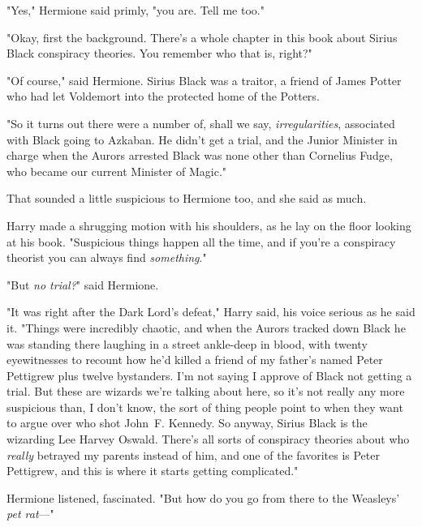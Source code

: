 "Yes," Hermione said primly, "you are. Tell me too."

"Okay, first the background. There's a whole chapter in this book about Sirius
Black conspiracy theories. You remember who that is, right?"

"Of course," said Hermione. Sirius Black was a traitor, a friend of James
Potter who had let Voldemort into the protected home of the Potters.

"So it turns out there were a number of, shall we say, \emph{irregularities},
associated with Black going to Azkaban. He didn't get a trial, and the Junior
Minister in charge when the Aurors arrested Black was none other than Cornelius
Fudge, who became our current Minister of Magic."

That sounded a little suspicious to Hermione too, and she said as much.

Harry made a shrugging motion with his shoulders, as he lay on the floor
looking at his book. "Suspicious things happen all the time, and if you're a
conspiracy theorist you can always find \emph{something}."

"But \emph{no trial?}" said Hermione.

"It was right after the Dark Lord's defeat," Harry said, his voice serious as
he said it. "Things were incredibly chaotic, and when the Aurors tracked down
Black he was standing there laughing in a street ankle-deep in blood, with
twenty eyewitnesses to recount how he'd killed a friend of my father's named
Peter Pettigrew plus twelve bystanders. I'm not saying I approve of Black not
getting a trial. But these are wizards we're talking about here, so it's not
really any more suspicious than, I don't know, the sort of thing people point
to when they want to argue over who shot John~F. Kennedy. So anyway, Sirius
Black is the wizarding Lee Harvey Oswald. There's all sorts of conspiracy
theories about who \emph{really} betrayed my parents instead of him, and one of
the favorites is Peter Pettigrew, and this is where it starts getting
complicated."

Hermione listened, fascinated. "But how do you go from there to the Weasleys'
\emph{pet rat}\mbox{---}"

